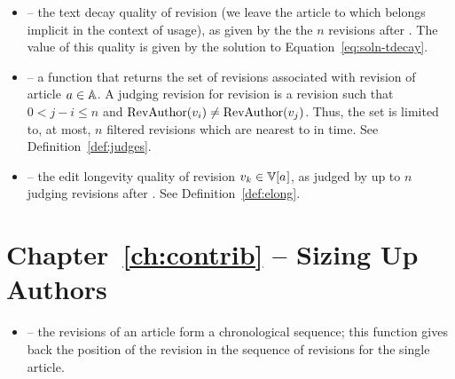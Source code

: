 \begin{itemize}

\item {} -- the text decay quality of revision
     (we leave the article to which  belongs
    implicit in the context of usage), as given by the the $n$ revisions
    after .
    The value of this quality is given by the solution to
    Equation~\ref{eq:soln-tdecay}.

\item {} -- a function that returns the set of
     revisions associated with revision 
    of article $a \in \mathbb{A}$.
    A judging revision for revision  is a revision 
    such that $0 < j - i \le n$ and
    $\mathrm{RevAuthor}(v_{i}) \not= \mathrm{RevAuthor}(v_{j})$.
    Thus, the set is limited to, at most, $n$ filtered revisions which are nearest
    to  in time.  See Definition~\ref{def:judges}.

\item {} -- the edit longevity quality of
    revision $\version{k} \in \versions{\article{}}$, as judged by up to
    $n$ judging revisions after .
    See Definition~\ref{def:elong}.

\end{itemize}

\section{Chapter~\ref{ch:contrib} -- Sizing Up Authors}

\begin{itemize}

\item {} -- the revisions of an article form a
    chronological sequence; this function gives back the position
    of the revision in the sequence of revisions for the single article.

\end{itemize}

\renewcommand{\labelitemi}{$\bullet$}




